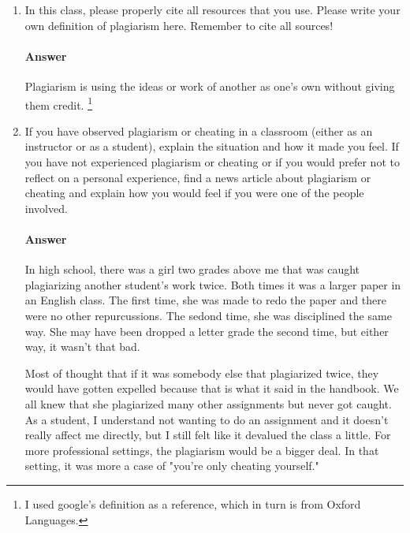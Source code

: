 \documentclass{article}
\begin{document}
\begin{enumerate}

      \item In this class, please properly cite all resources that you use. Please
            write your own definition of plagiarism here.  Remember to cite all
            sources!
            
            \paragraph{Answer}
            Plagiarism is using the ideas or work of another as one's own without giving them credit.  
            \footnote{I used google's definition as a reference, which in turn is from Oxford Languages.}
            
      \item If you have observed plagiarism or cheating in a classroom (either as
            an instructor or as a student), explain the situation and how it made
            you feel.  If you have not experienced plagiarism or cheating or if you
            would prefer not to reflect on a personal experience, find a news
            article about plagiarism or cheating and explain how you would feel if
            you were one of the people involved.
            
            \paragraph{Answer}
            In high school, there was a girl two grades above me that was caught plagiarizing
            another student's work twice. Both times it was a larger paper in an English class.
            The first time, she was made to redo the paper and there were no other repurcussions.
            The sedond time, she was disciplined the same way. She may have been dropped a letter grade
            the second time, but either way, it wasn't that bad. 
            
            Most of thought that if it was somebody else that plagiarized twice, they would have gotten expelled
            because that is what it said in the handbook. We all knew that she plagiarized many other assignments
            but never got caught. As a student, I understand not wanting to do an assignment and it doesn't really
            affect me directly, but I still felt like it devalued the class a little. For more professional settings,
            the plagiarism would be a bigger deal. In that setting, it was more a case of "you're only cheating yourself."
            
            
\end{enumerate}
\end{document}
